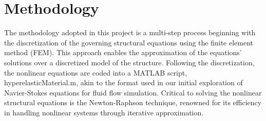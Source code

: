 \documentclass[a4paper,12pt]{article} %
\begin{document}
\section*{Methodology}
The methodology adopted in this project is a multi-step process beginning with the 
discretization of the governing structural equations using the finite element method 
(FEM). This approach enables the approximation of the equations' solutions over a 
discretized model of the structure. Following the discretization, the nonlinear 
equations are coded into a MATLAB script, hyperelasticMaterial.m, akin to the 
format used in our initial exploration of Navier-Stokes equations for fluid flow 
simulation. Critical to solving the nonlinear structural equations is the Newton-Raphson 
technique, renowned for its efficiency in handling nonlinear systems through iterative approximation.
\end{document}
